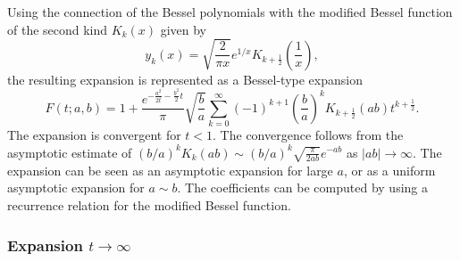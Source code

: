 \documentclass[10pt,a4paper,oneside]{article}
\numberwithin{equation}{section}
\begin{document}
Using the connection of the Bessel polynomials with the modified Bessel function of the second kind $K_k(x)$ given by \cite[\S 33.1.3]{Temme2015}
\begin{equation}
y_k(x) = \sqrt{\frac{2}{\pi x}}e^{1/x} K_{k + \frac{1}{2}}\left(\frac{1}{x}\right),
\end{equation}
the resulting expansion is represented as a Bessel-type expansion
\begin{equation}
F(t; a, b) = 1 + \frac{e^{-\frac{a^2}{2t} - \frac{b^2}{2}t}}{\pi}\sqrt{\frac{b}{a}}\sum_{k=0}^{\infty} (-1)^{k+1} \left(\frac{b}{a}\right)^k K_{k + \frac{1}{2}}(ab)t^{k + \frac{1}{2}}.
\end{equation}
The expansion is convergent for $t < 1$. The convergence follows from the asymptotic estimate of $(b/a)^k K_k(ab) \sim (b/a)^k \sqrt{\frac{\pi}{2ab}}e^{-ab}$ as $|ab| \to \infty$. The expansion can be seen as an asymptotic expansion for large $a$, or as a uniform asymptotic expansion for $a \sim b$. The coefficients can be computed by using a recurrence relation for the modified Bessel function.

\subsubsection{Expansion $t \to \infty$}
\end{document}
